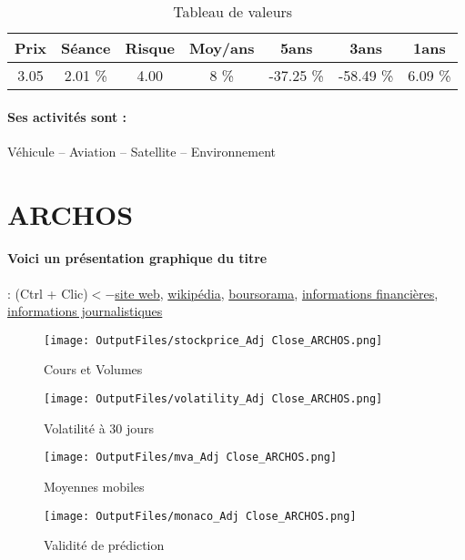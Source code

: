 \documentclass[11pt,a4paper]{report}%
\begin{document}
\begin{table}[H]
  \centering
    \begin{tabular}{|c|c|c|c|c|c|c|}
    \hline
    Prix & Séance & Risque  & Moy/ans & 5ans & 3ans & 1ans \\
    \hline
    3.05 &    2.01 \%    & 4.00 & 8 \% & -37.25 \% & -58.49 \% & 6.09 \% \\
    \hline
    \end{tabular}%
        \label{tab:table_ACTIA GROUP}%
      \caption{Tableau de valeurs}
\end{table}%

\paragraph{Ses activités sont : } Véhicule – Aviation – Satellite – Environnement 
    
    \newpage

\section{ARCHOS}

\paragraph{Voici un présentation graphique du titre} : (Ctrl + Clic)$<-$\href{http://www.archos.com/}{site web}, \href{https://fr.wikipedia.org/wiki/Archos}{wikipédia}, \href{https://www.boursorama.com/cours/1rPJXR}{boursorama}, \href{https://www.qwant.com/?q=site:https:%2f%2fwww.easybourse.com%2faction-societe%2fARCHOS&t=web&client=ext-firefox-hp}{informations financières}, \href{https://bourse.lerevenu.com/cours-de-bourse/fiche-valeur-synthese/ARCHOS/JXR-FR}{informations journalistiques}
\begin{figure}[!htb]
   \begin{minipage}{0.5\textwidth}
     \centering
     \texttt{[image: OutputFiles/stockprice\_Adj Close\_ARCHOS.png]}
     \caption{Cours et Volumes}\label{Fig:price_ARCHOS}
   \end{minipage}\hfill
   \begin{minipage}{0.5\textwidth}
     \centering
     \texttt{[image: OutputFiles/volatility\_Adj Close\_ARCHOS.png]}
     \caption{Volatilité à 30 jours}\label{Fig:volat_ARCHOS}
   \end{minipage}
\end{figure}
\begin{figure}[!htb]
   \begin{minipage}{0.5\textwidth}
     \centering
     \texttt{[image: OutputFiles/mva\_Adj Close\_ARCHOS.png]}
     \caption{Moyennes mobiles}\label{Fig:mva_ARCHOS}
   \end{minipage}\hfill
   \begin{minipage}{0.5\textwidth}
     \centering
     \texttt{[image: OutputFiles/monaco\_Adj Close\_ARCHOS.png]}
     \caption{Validité de prédiction}\label{Fig:prediction_ARCHOS}
   \end{minipage}
\end{figure}
\end{document}
